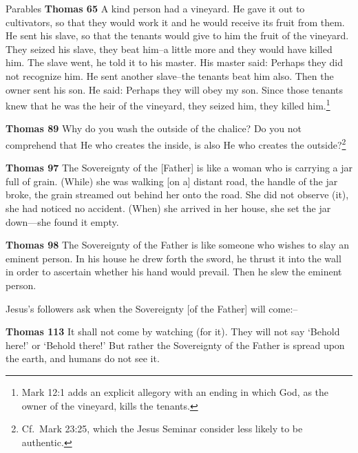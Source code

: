 \documentclass[10pt,twoside]{article} %
\newcommand{\quotesize}{\normalsize{}}
\newcommand{\comm}[1]{\begingroup \color{black!50} #1\endgroup}
\newenvironment{quotetext}{\begingroup\quotesize}{\endgroup}
\newcommand{\bible}[2]{\begin{quotetext}\textbf{#1} #2\end{quotetext}}
\newcommand{\thomas}[2]{\bible{Thomas #1}{#2}}
\begin{document}
\begin{section}{Parables}
\thomas{65}{
A kind person had a vineyard. He gave it out to cultivators, so that they would work it and he would receive its fruit from them. He sent his slave, so that the tenants would give to him the fruit of the vineyard. They seized his slave, they beat him--a little more and they would have killed him. The slave went, he told it to his master. His master said: Perhaps they did not recognize him. He sent another slave--the tenants beat him also. Then the owner sent his son. He said: Perhaps they will obey my son. Since those tenants knew that he was the heir of the vineyard, they seized him, they killed him.\footnote{Mark 12:1 adds an explicit allegory with an ending in which God, as the owner of the vineyard, kills the tenants.}
}

\thomas{89}{
Why do you wash the outside of the chalice? Do you not comprehend that He who creates the inside, is also He who creates the outside?\footnote{Cf.~Mark
23:25, which the Jesus Seminar consider less likely to be authentic.}
}

\thomas{97}{
The Sovereignty of the [Father] is like a woman who is carrying a jar full of grain. (While) she was walking [on a] distant road, the handle of the jar broke, the grain streamed out behind her onto the road. She did not observe (it), she had noticed no accident. (When) she arrived in her house, she set the jar down—she found it empty.
}

\thomas{98}{
The Sovereignty of the Father is like someone who wishes to slay an eminent person. In his house he drew forth the sword, he thrust it into the wall in order to ascertain whether his hand would prevail. Then he slew the eminent person.
}

\comm{Jesus's followers ask when the Sovereignty [of the Father] will come:--}

\thomas{113}{
It shall not come by watching (for it). They will not say `Behold here!' or `Behold there!' But rather the Sovereignty of the Father is spread upon the earth, and humans do not see it.
}

\end{section}
\end{document}
